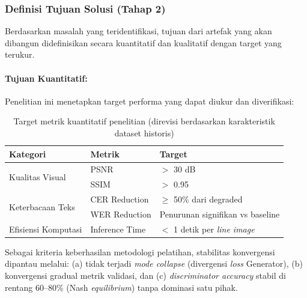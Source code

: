 \documentclass[12pt,a4paper]{article}
\begin{document}
\subsubsection{Definisi Tujuan Solusi (Tahap 2)}
Berdasarkan masalah yang teridentifikasi, tujuan dari artefak yang akan dibangun didefinisikan secara kuantitatif dan kualitatif dengan target yang terukur.

\paragraph{Tujuan Kuantitatif:}

Penelitian ini menetapkan target performa yang dapat diukur dan diverifikasi:

\begin{table}[H]
\centering
\caption[Target Metrik Kuantitatif Penelitian (Revisi)]{Target metrik kuantitatif penelitian (direvisi berdasarkan karakteristik dataset historis)}
\label{tab:target-metrik}
\small
\begin{tabular}{|l|l|l|}
\hline
Kategori & Metrik & Target \\ \hline
\multirow{2}{*}{Kualitas Visual} & PSNR & $>$ 30 dB \footnotemark[1] \\ \cline{2-3}
 & SSIM & $>$ 0.95 \\ \hline
\multirow{2}{*}{Keterbacaan Teks} & CER Reduction & $\geq$ 50\% dari degraded \footnotemark[2] \\ \cline{2-3}
 & WER Reduction & Penurunan signifikan vs baseline \\ \hline
Efisiensi Komputasi & Inference Time & $<$ 1 detik per \textit{line image} \\ \hline
\end{tabular}
\end{table}


Sebagai kriteria keberhasilan metodologi pelatihan, stabilitas konvergensi dipantau melalui: (a) tidak terjadi \textit{mode collapse} (divergensi \textit{loss} Generator), (b) konvergensi gradual metrik validasi, dan (c) \textit{discriminator accuracy} stabil di rentang 60--80\% (Nash \textit{equilibrium}) tanpa dominasi satu pihak.
\end{document}
